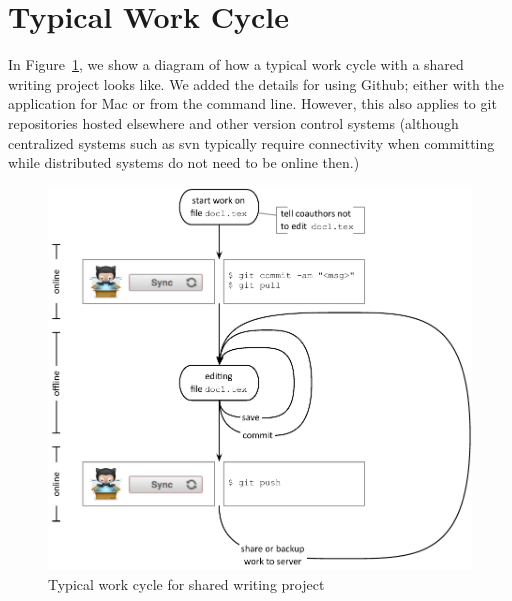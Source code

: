 
\section{Typical Work Cycle}

In Figure~\ref{fig:work cycle}, we show a diagram of how a typical work cycle with a shared writing project looks like.  We added the details for using Github; either with the application for Mac or from the command line.  However, this also applies to git repositories hosted elsewhere and other version control systems (although centralized systems such as svn typically require connectivity when committing while distributed systems do not need to be online then.)

\begin{figure}
\centering
\includegraphics{figures/workcycle.pdf}
\caption{Typical work cycle for shared writing project} \label{fig:work cycle}
\end{figure}

